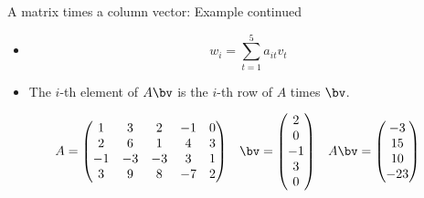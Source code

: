 \documentclass{beamer}
\begin{document}
\begin{frame}{A matrix times a column vector: Example continued}

\begin{itemize}
\item $$w_i = \sum_{t=1}^5 a_{it} v_{t}$$
\item The $i$-th element of $A\bv$ is the $i$-th row of $A$ times $\bv$.
\end{itemize}

$$
\begin{matrix}
A =

\begin{pmatrix}
1 & 3 & 2 & -1 & 0 \\
2 & 6 & 1 & 4 & 3\\
-1 & -3 & -3 & 3 & 1 \\
3 & 9 & 8 & -7 & 2
\end{pmatrix}

&

\bv =

\begin{pmatrix}
2 \\ 0 \\ -1\\ 3 \\ 0
\end{pmatrix}

&

A \bv =

\begin{pmatrix}
-3 \\ 15 \\ 10 \\ -23
\end{pmatrix}

\end{matrix}
$$

\end{frame}

\end{document}
